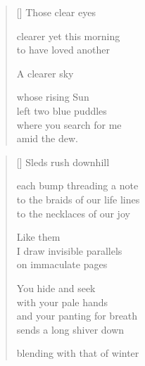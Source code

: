\documentclass[14pt]{extbook}
\newcommand*{\centeredornament}{\centerline{\pgfornament[width=6cm]{88}}}
\begin{document}

\settowidth{\versewidth}{where you search for me}

\begin{verse}[\versewidth]
  Those clear eyes

  clearer yet this morning \\
  to have loved another

  A clearer sky

  whose rising Sun \\
  left two blue puddles \\
  where you search for me \\
  amid the dew.
\end{verse}


\newpage

\vspace*{-15mm}
\centeredornament
\vspace*{-7mm}


\settowidth{\versewidth}{to the necklaces of their laughter}

\begin{verse}[\versewidth]
  Sleds rush downhill

  each bump threading a note \\
  to the braids of our life lines \\
  to the necklaces of our joy

  Like them \\
  I draw invisible parallels \\
  on immaculate pages

  You hide and seek \\
  with your pale hands \\
  and your panting for breath \\
  sends a long shiver down

  blending with that of winter
\end{verse}

\newpage

\settowidth{\versewidth}{in the calm stream of your words}
\end{document}
